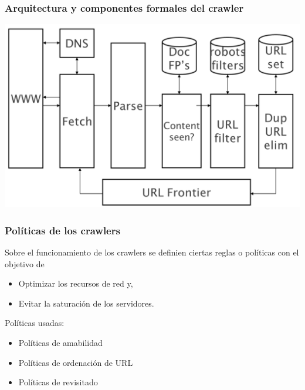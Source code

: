 \documentclass[
10pt, %
aspectratio=169, %
]{beamer}
\begin{document}
	\begin{frame}
		
		\frametitle{Arquitectura y componentes formales del crawler}
		
		\centering 
		\includegraphics[scale=0.5]{arq-f-crawler.png}
		
		
	\end{frame}
	
	\begin{frame}
		
		\frametitle{Políticas de los crawlers}
		
		Sobre el funcionamiento de los crawlers se definien ciertas reglas o políticas con el objetivo de 
		\begin{itemize}
			\item Optimizar los recursos de red y,
			\item Evitar la saturación de los servidores.
		\end{itemize} 
		
		\vspace{2\baselineskip}
		
		Políticas usadas:
		\begin{itemize}
			\item Políticas de amabilidad
			\item Políticas de ordenación de URL
			\item Políticas de revisitado
		\end{itemize}
		
	\end{frame}
	
\end{document}
